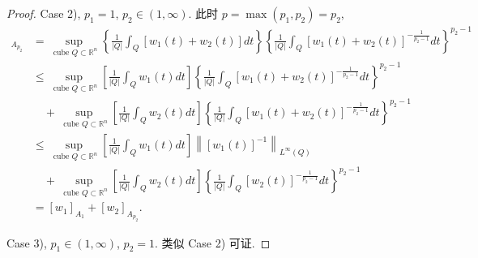 \documentclass[a4paper,11pt]{article}
\theoremstyle{definition}
\begin{document}
\begin{CJK*}{UTF8}{gbsn}
\begin{proof}
    Case 2), $ p_1 = 1 $, $ p_2 \in (1, \infty) $. 此时 $ p = \max(p_1, p_2) = p_2 $,
    \begin{align*}
        [w_1 + w_2]_{A_{p_2}} 
            &= \sup_{\text{ cube } Q \subset \mathbb{R}^n} 
                \left\{ \frac{1}{|Q|} \int_Q [w_1(t) + w_2(t)] dt \right\}
                \left\{ \frac{1}{|Q|} \int_Q [w_1(t) + w_2(t)]^{-\frac{1}{p_2 - 1}}dt \right\}^{p_2 - 1} \\
            &\leq \sup_{\text{ cube } Q \subset \mathbb{R}^n} 
                \left[ \frac{1}{|Q|} \int_Q w_1(t)  dt \right]
                \left\{ \frac{1}{|Q|} \int_Q [w_1(t) + w_2(t)]^{-\frac{1}{p_2 - 1}}dt \right\}^{p_2 - 1} \\
                &\quad+ \sup_{\text{ cube } Q \subset \mathbb{R}^n} 
                    \left[ \frac{1}{|Q|} \int_Q w_2(t)  dt \right] 
                    \left\{ \frac{1}{|Q|} \int_Q [w_1(t) + w_2(t)]^{-\frac{1}{p_2 - 1}}dt \right\}^{p_2 - 1} \\
            &\leq \sup_{\text{ cube } Q \subset \mathbb{R}^n} 
                \left[ \frac{1}{|Q|} \int_Q w_1(t)  dt \right]
                \left\| [w_1(t)]^{-1} \right\|_{L^\infty (Q)} \\
                &\quad+ \sup_{\text{ cube } Q \subset \mathbb{R}^n} 
                    \left[ \frac{1}{|Q|} \int_Q w_2(t)  dt \right] 
                    \left\{ \frac{1}{|Q|} \int_Q [w_2(t)]^{-\frac{1}{p_2 - 1}}dt \right\}^{p_2 - 1} \\
            &= [w_1]_{A_1} + [w_2]_{A_{p_2}}.
    \end{align*}
    
    Case 3), $ p_1 \in (1, \infty) $, $ p_2 = 1 $. 类似 Case 2) 可证.
    

\end{proof}
\end{CJK*}
\end{document}
